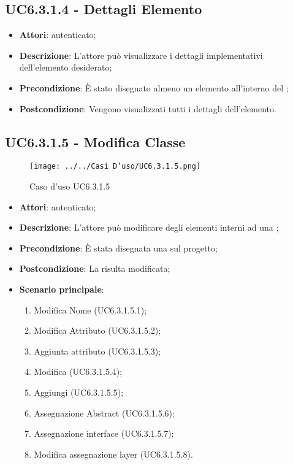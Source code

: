 \subsection{UC6.3.1.4 - Dettagli Elemento}
\label{ssec:UC6.3.1.4}
\begin{itemize}
\item \textbf{Attori}:  autenticato;
\item \textbf{Descrizione}: L'attore può visualizzare i dettagli implementativi dell'elemento desiderato;
\item \textbf{Precondizione}: È stato disegnato almeno un elemento all'interno del ;
\item \textbf{Postcondizione}: Vengono visualizzati tutti i dettagli dell'elemento.
\end{itemize}
\newpage
\subsection{UC6.3.1.5 - Modifica Classe}
\label{ssec:UC6.3.1.5}
\begin{figure}[h!]
\centering
\texttt{[image: ../../Casi D'uso/UC6.3.1.5.png]}
\caption{Caso d'uso UC6.3.1.5}
 \end{figure}
\begin{itemize}
\item \textbf{Attori}:  autenticato;
\item \textbf{Descrizione}: L'attore può modificare degli elementi interni ad una ;
\item \textbf{Precondizione}: È stata disegnata una  sul progetto;
\item \textbf{Postcondizione}: La  risulta modificata;
\item \textbf{Scenario principale}: \begin{enumerate}\item Modifica Nome (UC6.3.1.5.1);\item Modifica Attributo (UC6.3.1.5.2);\item Aggiunta attributo (UC6.3.1.5.3);\item Modifica  (UC6.3.1.5.4);\item Aggiungi  (UC6.3.1.5.5);\item Assegnazione Abstract (UC6.3.1.5.6);\item Assegnazione interface (UC6.3.1.5.7);\item Modifica assegnazione layer (UC6.3.1.5.8).
 \end{enumerate}
\end{itemize}
